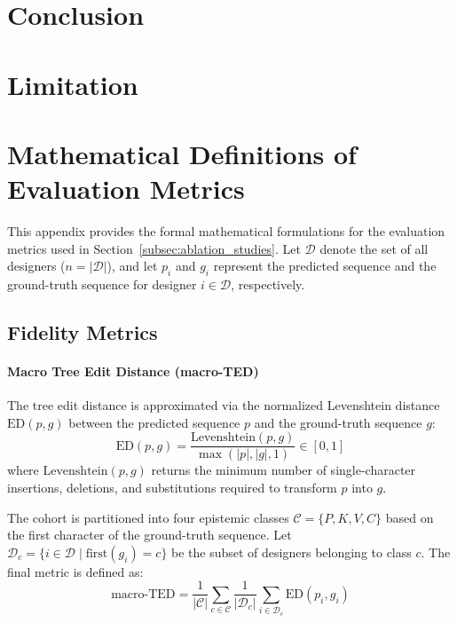 \documentclass[11pt]{article}
\begin{document}
\section{Conclusion}

\section{Limitation}

%


\appendix

\section{Mathematical Definitions of Evaluation Metrics}
\label{sec:appendix_metrics}

This appendix provides the formal mathematical formulations for the evaluation metrics used in Section~\ref{subsec:ablation_studies}. Let $\mathcal{D}$ denote the set of all designers ($n = |\mathcal{D}|$), and let $p_i$ and $g_i$ represent the predicted sequence and the ground-truth sequence for designer $i \in \mathcal{D}$, respectively.

\subsection{Fidelity Metrics}

\paragraph{Macro Tree Edit Distance (macro-TED)}
The tree edit distance is approximated via the normalized Levenshtein distance $\text{ED}(p, g)$ between the predicted sequence $p$ and the ground-truth sequence $g$:
\begin{equation}
\text{ED}(p, g) = \frac{\text{Levenshtein}(p, g)}{\max(|p|, |g|, 1)} \in [0, 1]
\end{equation}
where $\text{Levenshtein}(p, g)$ returns the minimum number of single-character insertions, deletions, and substitutions required to transform $p$ into $g$. 

The cohort is partitioned into four epistemic classes $\mathcal{C} = \{P, K, V, C\}$ based on the first character of the ground-truth sequence. Let $\mathcal{D}_c = \{i \in \mathcal{D} \mid \text{first}(g_i) = c\}$ be the subset of designers belonging to class $c$. The final metric is defined as:
\begin{equation}
\text{macro-TED} = \frac{1}{|\mathcal{C}|} \sum_{c \in \mathcal{C}} \frac{1}{|\mathcal{D}_c|} \sum_{i \in \mathcal{D}_c} \text{ED}(p_i, g_i)
\end{equation}
\end{document}
